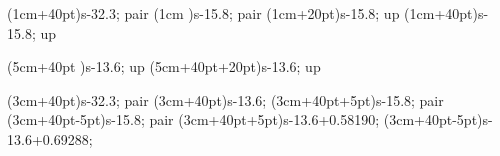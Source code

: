 \begin{questionBox}
    \begin{center}
        \begin{modiagram}
            \setlength\AtomVScale{0.25cm}

            \AO(1cm+40pt){s}{-32.3\AtomVScale; pair} %
            \AO(1cm     ){s}{-15.8\AtomVScale; pair} %
            \AO(1cm+20pt){s}{-15.8\AtomVScale; up  } %
            \AO(1cm+40pt){s}{-15.8\AtomVScale; up  } %

            \AO(5cm+40pt     ){s}{-13.6\AtomVScale; up} %
            \AO(5cm+40pt+20pt){s}{-13.6\AtomVScale; up} %

            \AO(3cm+40pt){s}{-32.3\AtomVScale; pair}   %
            \AO(3cm+40pt){s}{-13.6\AtomVScale;     }   %
            \AO(3cm+40pt+5pt){s}{-15.8\AtomVScale; pair}   %
            \AO(3cm+40pt-5pt){s}{-15.8\AtomVScale; pair}   %
            \AO(3cm+40pt+5pt){s}{-13.6\AtomVScale+0.58190\AtomVScale;     }   %
            \AO(3cm+40pt-5pt){s}{-13.6\AtomVScale+0.69288\AtomVScale;     }   %


            \EnergyAxis[title=E, head=stealth]

        \end{modiagram}
    \end{center}

\end{questionBox}